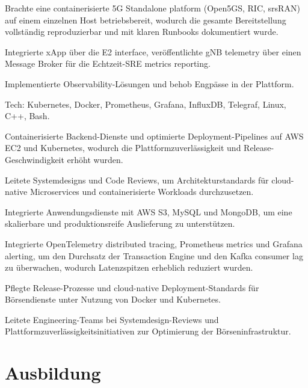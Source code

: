 \documentclass[10pt,a4paper]{resume}
\begin{document}
\bullets
  \item Brachte eine containerisierte 5G Standalone platform (Open5GS, RIC, srsRAN) auf einem einzelnen Host betriebsbereit, wodurch die gesamte Bereitstellung vollständig reproduzierbar und mit klaren Runbooks dokumentiert wurde.
  \item Integrierte xApp über die E2 interface, veröffentlichte gNB telemetry über einen Message Broker für die Echtzeit-SRE metrics reporting.
  \item Implementierte Observability-Lösungen und behob Engpässe in der Plattform.
  \item Tech: Kubernetes, Docker, Prometheus, Grafana, InfluxDB, Telegraf, Linux, C++, Bash.
\bulletsend
\vspace{1.5pt}
\bullets
  \item Containerisierte Backend-Dienste und optimierte Deployment-Pipelines auf AWS EC2 und Kubernetes, wodurch die Plattformzuverlässigkeit und Release-Geschwindigkeit erhöht wurden.
  \item Leitete Systemdesigns und Code Reviews, um Architekturstandards für cloud-native Microservices und containerisierte Workloads durchzusetzen.
  \item Integrierte Anwendungsdienste mit AWS S3, MySQL und MongoDB, um eine skalierbare und produktionsreife Auslieferung zu unterstützen.
\bulletsend
\vspace{1.5pt}
\bullets
  \item Integrierte OpenTelemetry distributed tracing, Prometheus metrics und Grafana alerting, um den Durchsatz der Transaction Engine und den Kafka consumer lag zu überwachen, wodurch Latenzspitzen erheblich reduziert wurden.
  \item Pflegte Release-Prozesse und cloud-native Deployment-Standards für Börsendienste unter Nutzung von Docker und Kubernetes.
  \item Leitete Engineering-Teams bei Systemdesign-Reviews und Plattformzuverlässigkeitsinitiativen zur Optimierung der Börseninfrastruktur.
\bulletsend
\vspace{1.5pt}

\section{Ausbildung}
\end{document}
